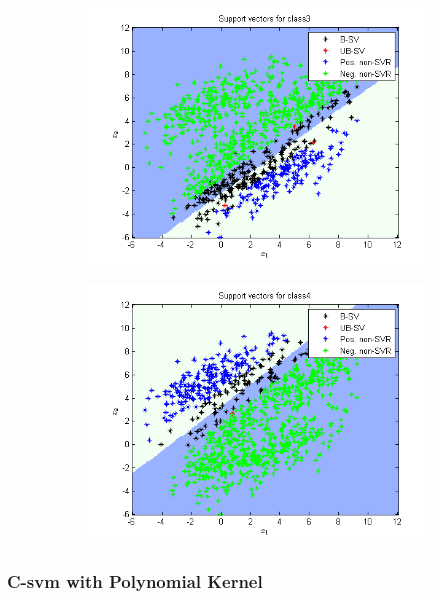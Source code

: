 \documentclass{article}
\begin{document}
\begin{figure}
\begin{subfigure}{.5\textwidth}
  \centering
  \includegraphics[width=.8\linewidth]{Classification/1c/c_linear/sv3}
 
\end{subfigure}%
\begin{subfigure}{.5\textwidth}
  \centering
  \includegraphics[width=.8\linewidth]{Classification/1c/c_linear/sv4}
  
\end{subfigure}
\end{figure}

\subsubsection{C-svm with Polynomial Kernel}
\end{document}
